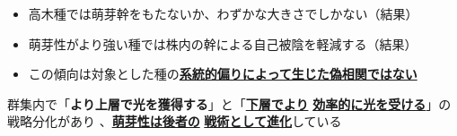 \documentclass[a0, 30pt, plainboxedsections, draft]{sciposter} %
\renewcommand{\baselinestretch}{1.2}
\begin{document}
\begin{multicols}{2}
\begin{mdframed}[style=conclusion.frame,frametitle={\textbf{\Large{{萌芽性は樹高と背反的に進化しており、\\\hspace*{2.8em}群集の中に多様な萌芽性をもつ種が存在する}}}}]
{  \begin{itemize}
    \item 高木種では萌芽幹をもたないか、わずかな大きさでしかない（結果）
    \item 萌芽性がより強い種では株内の幹による自己被陰を軽減する（結果）
    \item この傾向は対象とした種の\textbf{\underline{系統的偏りによって生じた偽相関ではない}}
\end{itemize}
  }
  
  \large{\faHandLeft 群集内で「\textbf{より上層で光を獲得する}」と「\textbf{\underline{下層でより}} \textbf{\underline{効率的に光を受ける}}」の戦略分化があり
  、\textbf{\underline{萌芽性は後者の}} \textbf{\underline{戦術として進化}}している}
 
\end{mdframed}

\end{multicols}
\begin{mdframed}[style=section.frame]
  \centering\LARGE\textbf{\color{white}{方法}}
\end{mdframed}\vspace{-1.2em}
\end{document}
